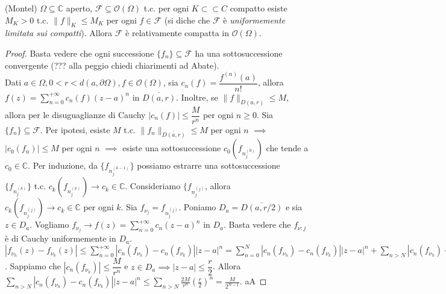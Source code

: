 \begin{thm}
  (Montel) $\Omega \subseteq \mathbb{C}$ aperto, $\mathcal{F} \subseteq \mathcal{O}(\Omega)$ t.c. per ogni $K \subset \subset C$ compatto esiste $M_K>0$ t.c. $\|f\|_K \le M_K$ per ogni $f \in \mathcal{F}$ (si diche che $\mathcal{F}$ è \textit{uniformemente limitata sui compatti}).
  Allora $\mathcal{F}$ è relativamente compatta in $\mathcal{O}(\Omega)$.
\end{thm}

\begin{proof}
  Basta vedere che ogni successione $\{f_n\} \subseteq \mathcal{F}$ ha una sottosuccessione convergente (??? alla peggio chiedi chiarimenti ad Abate). \\
  Dati $a \in \Omega, 0<r<d(a, \partial \Omega), f \in \mathcal{O}(\Omega)$, sia $c_n(f)=\dfrac{f^{(n)}(a)}{n!}$, allora $\displaystyle f(z)=\sum_{n=0}^{+\infty} c_n(f)(z-a)^n$ in $\overline{D(a, r)}$.
  Inoltre, se $\|f\|_{\overline{D(a, r)}} \le M$, allora per le disuguaglianze di Cauchy $|c_n(f)| \le \dfrac{M}{r^n}$ per ogni $n \ge 0$.
  Sia $\{f_n\} \subseteq \mathcal{F}$. Per ipotesi, esiste $M$ t.c. $\|f_n\|_{\overline{D(a, r)}} \le M$ per ogni $n$ $\implies$ $|c_0(f_n)| \le M$ per ogni $n$ $\implies$ esiste una sottosuccessione $c_0(f_{n_j^{(0)}})$ che tende a $c_0 \in \mathbb{C}$.
  Per  induzione, da $\{f_{n_j^{(k-1)}}\}$ possiamo estrarre una sottosuccessione $\{f_{n_j^{(k)}}\}$ t.c. $c_k(f_{n_j^{(k)}}) \rightarrow c_k \in \mathbb{C}$. Consideriamo $\{f_{n_j^{(j)}}$, allora $c_k(f_{n_j^{(j)}}) \rightarrow c_k \in \mathbb{C}$ per ogni $k$.
  Sia $f_{\nu_j}=f_{n_j^{(j)}}$. Poniamo $D_a=\overline{D(a, r/2)}$ e sia $z \in D_a$. Vogliamo $\displaystyle f_{\nu_j} \rightarrow f(z)=\sum_{n=0}^{+\infty} c_n(z-a)^n$ in $D_a$. Basta vedere che $f_{\nu:j}$ è di Cauchy uniformemente in $D_a$.
  $\displaystyle |f_{\nu_h}(z)-f_{\nu_k}(z)| \le \sum_{n=0}^{+\infty} |c_n(f_{\nu_h})-c_n(f_{\nu_k})||z-a|^n=\sum_{n=0}^N |c_n(f_{\nu_h})-c_n(f_{\nu_k})||z-a|^n+\sum_{n>N} |c_n(f_{\nu_h})-c_n(f_{\nu_k})||z-a|^n$.
  Sappiamo che $|c_n(f_{\nu_k})| \le \dfrac{M}{r^n}$ e $z \in D_a \implies |z-a| \le \dfrac{r}{2}$.
  Allora $\displaystyle \sum_{n>N} |c_n(f_{\nu_h})-c_n(f_{\nu_k})||z-a|^n \le \sum_{n>N} \frac{2M}{r^n}\left(\frac{r}{2}\right)^n=\frac{M}{2^{N-1}}$.
  aA
\end{proof}
